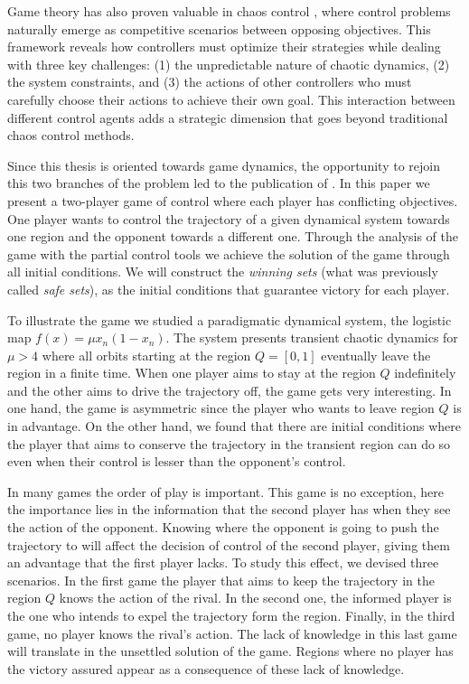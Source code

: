 Game theory has also proven valuable in chaos control \cite{GamesControl}, where control problems naturally emerge as competitive scenarios between opposing objectives. This framework reveals how controllers must optimize their strategies while dealing with three key challenges: (1) the unpredictable nature of chaotic dynamics, (2) the system constraints, and (3) the actions of other controllers who must carefully choose their actions to achieve their own goal. This interaction between different control agents adds a strategic dimension that goes beyond traditional chaos control methods.

Since this thesis is oriented towards game dynamics, the opportunity to rejoin this two branches of the problem led to the publication of \cite{PartialControlGame}. In this paper we present a two-player game of control where each player has conflicting objectives. One player wants to control the trajectory of a given dynamical system towards one region and the opponent towards a different one. Through the analysis of the game with the partial control tools we achieve the solution of the game through all initial conditions. We will construct the \textit{winning sets} (what was previously called \textit{safe sets}), as the initial conditions that guarantee victory for each player.

To illustrate the game we studied a paradigmatic dynamical system, the logistic map ${f(x) = \mu x_n(1-x_n)}$. The system presents transient chaotic dynamics for $\mu>4$ where all orbits starting at the region $Q=[0,1]$ eventually leave the region in a finite time. When one player aims to stay at the region $Q$ indefinitely and the other aims to drive the trajectory off, the game gets very interesting. In one hand, the game is asymmetric since the player who wants to leave region $Q$ is in advantage. On the other hand, we found that there are initial conditions where the player that aims to conserve the trajectory in the transient region can do so even when their control is lesser than the opponent's control.

In many games the order of play is important. This game is no exception, here the importance lies in the information that the second player has when they see the action of the opponent. Knowing where the opponent is going to push the trajectory to will affect the decision of control of the second player, giving them an advantage that the first player lacks. To study this effect, we devised three scenarios. In the first game the player that aims to keep the trajectory in the region $Q$ knows the action of the rival. In the second one, the informed player is the one who intends to expel the trajectory form the region. Finally, in the third game, no player knows the rival's action. The lack of knowledge in this last game will translate in the unsettled solution of the game. Regions where no player has the victory assured appear as a consequence of these lack of knowledge.


